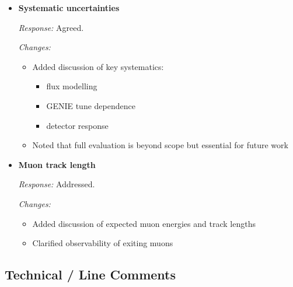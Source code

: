 \documentclass[11pt]{article}
\begin{document}
\begin{itemize}[leftmargin=*]
\item \textbf{Systematic uncertainties}

\textit{Response:} Agreed.

\textit{Changes:}
\begin{itemize}
\item Added discussion of key systematics:
\begin{itemize}
\item flux modelling
\item GENIE tune dependence
\item detector response
\end{itemize}
\item Noted that full evaluation is beyond scope but essential for future work
\end{itemize}

\item \textbf{Muon track length}

\textit{Response:} Addressed.

\textit{Changes:}
\begin{itemize}
\item Added discussion of expected muon energies and track lengths
\item Clarified observability of exiting muons
\end{itemize}

\end{itemize}

\subsection*{Technical / Line Comments}
\end{document}
